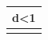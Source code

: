 \documentclass{article}
\newcommand\nb{1}
\begin{document}
\begin{tabular}{|>{\centering\arraybackslash}m{1cm}|}\hline
d\ifnum1<\nb\\\hline\fi \\ \hline
\end{tabular}
\end{document}
